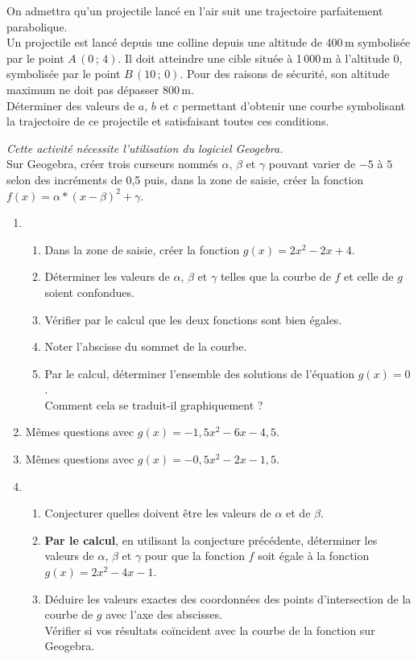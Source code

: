 \documentclass[11pt]{article}
\begin{document}
\begin{exercice}
\begin{enumerate}
	     On admettra qu'un projectile lancé en l'air suit une trajectoire parfaitement parabolique.\\
	     Un projectile est lancé depuis une colline depuis une altitude de 400\,m symbolisée par le point $A\,(0\,;\,4)$. Il doit atteindre une cible située à 1\,000\,m à l'altitude 0, symbolisée par le point $B\,(10\,;\,0)$. Pour des raisons de sécurité, son altitude maximum ne doit pas dépasser 800\,m.\\
	     Déterminer des valeurs de $a$, $b$ et $c$ permettant d'obtenir une courbe symbolisant la trajectoire de ce projectile et satisfaisant toutes ces conditions.
\end{enumerate}
\end{exercice}

\begin{exercice}
\emph{Cette activité nécessite l'utilisation du logiciel {Geogebra}.}\\
Sur Geogebra, créer trois curseurs nommés $\alpha$, $\beta$ et $\gamma$ pouvant varier de $-5$ à $5$ selon des incréments de 0,5  puis, dans la zone de saisie, créer la fonction $f(x)=\alpha*(x-\beta)^2+\gamma$.
\begin{enumerate}
 \item \begin{enumerate}
        \item Dans la zone de saisie, créer la fonction $g(x)=2x^2-2x+4$.
	\item Déterminer les valeurs de $\alpha$, $\beta$ et $\gamma$ telles que la courbe de $f$ et celle de $g$ soient confondues.
	\item Vérifier par le calcul que les deux fonctions sont bien égales.
	\item Noter l'abscisse du sommet de la courbe.
	\item Par le calcul, déterminer l'ensemble des solutions de l'équation $g(x)=0$.\\ Comment cela se traduit-il graphiquement ?
       \end{enumerate}
 \item Mêmes questions avec $g(x)=-1,5x^2-6x-4,5$.
 \item Mêmes questions avec $g(x)=-0,5x^2-2x-1,5$.
 \item \begin{enumerate}
        \item Conjecturer quelles doivent être les valeurs de $\alpha$ et de $\beta$.
	\item \textbf{Par le calcul}, en utilisant la conjecture précédente, déterminer les valeurs de $\alpha$, $\beta$ et $\gamma$ pour que la fonction $f$ soit égale à la fonction $g(x)=2x^2-4x-1$.
	\item Déduire les valeurs exactes des coordonnées des points d'intersection de la courbe de $g$ avec l'axe des abscisses. \\ Vérifier si vos résultats co\"incident avec la courbe de la fonction sur Geogebra.
       \end{enumerate}
\end{enumerate}
\end{exercice}
\end{document}
